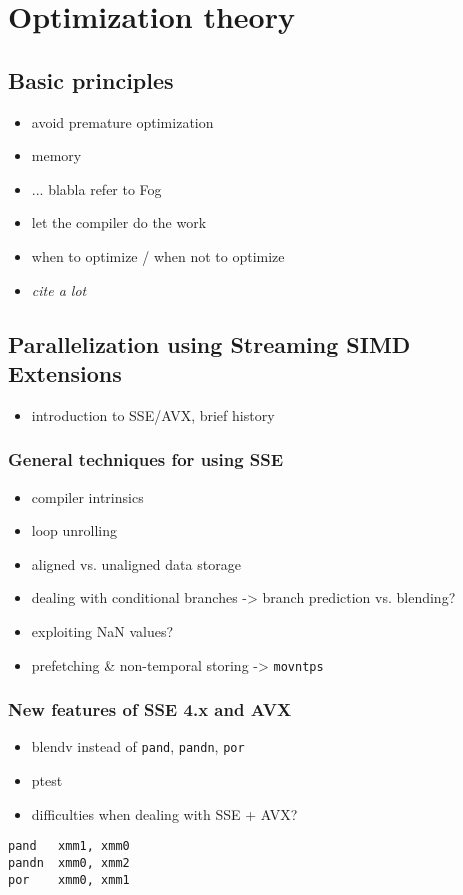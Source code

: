 \section{Optimization theory}
\subsection{Basic principles}
\begin{itemize}
\item avoid premature optimization
\item memory
\item ... blabla refer to Fog
\item let the compiler do the work
\item when to optimize / when not to optimize
\item \emph{cite a lot}
\end{itemize}
\subsection{Parallelization using Streaming SIMD Extensions}
\begin{itemize}
\item introduction to SSE/AVX, brief history
\end{itemize}
\subsubsection{General techniques for using SSE}
\begin{itemize}
\item compiler intrinsics
\item loop unrolling
\item aligned vs. unaligned data storage
\item dealing with conditional branches -> branch prediction vs. blending?
\item exploiting NaN values?
\item prefetching \& non-temporal storing -> \texttt{movntps}
\end{itemize}
\subsubsection{New features of SSE 4.x and AVX}
\begin{itemize}
\item blendv instead of \texttt{pand}, \texttt{pandn}, \texttt{por}
\item ptest
\item difficulties when dealing with SSE + AVX?
\end{itemize}
\lstset{language=XML,}
\begin{lstlisting}
pand   xmm1, xmm0
pandn  xmm0, xmm2
por    xmm0, xmm1
\end{lstlisting}
